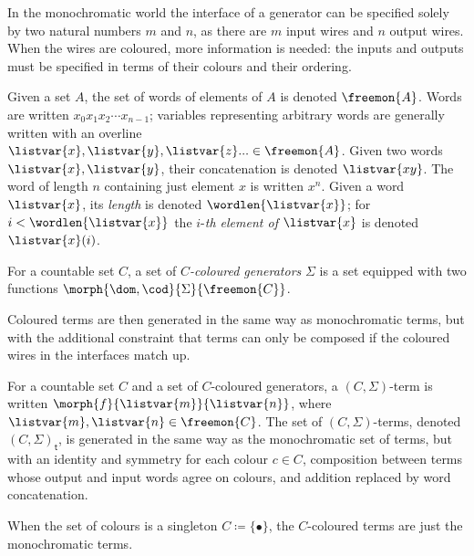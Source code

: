 In the monochromatic world the interface of a generator can be specified solely
by two natural numbers \(m\) and \(n\), as there are \(m\) input wires and
\(n\) output wires.
When the wires are coloured, more information is needed: the inputs and outputs
must be specified in terms of their colours and their ordering.

\begin{notation}[Words]
    Given a set \(A\), the set of words of elements of \(A\) is denoted
    \(\freemon{A}\).
    Words are written \(x_0x_1x_2{\cdots}x_{n-1}\); variables representing
    arbitrary words are generally written with an
    overline \(
    \listvar{x}, \listvar{y}, \listvar{z}... \in \freemon{A}
    \).
    Given two words \(\listvar{x}, \listvar{y}\), their concatenation is
    denoted \(\listvar{xy}\).
    The word of length \(n\) containing just element \(x\) is written \(x^n\).
    Given a word \(\listvar{x}\), its \emph{length} is denoted
    \(\wordlen{\listvar{x}}\); for \(i < \wordlen{\listvar{x}}\) the
    \(i\)-\emph{th element of \(\listvar{x}\)} is denoted \(\listvar{x}(i)\).
\end{notation}

\begin{definition}
    For a countable set \(C\), a set of \emph{\(C\)-coloured generators}
    \(\Sigma\) is a set equipped with two functions
    \(\morph{\dom,\cod}{\Sigma}{\freemon{C}}\).
\end{definition}

Coloured terms are then generated in the same way as monochromatic terms, but
with the additional constraint that terms can only be composed if the coloured
wires in the interfaces match up.

\begin{definition}
    For a countable set \(C\) and a set of \(C\)-coloured generators, a
    \((C,\Sigma)\)-term is written \(\morph{f}{\listvar{m}}{\listvar{n}}\),
    where \(\listvar{m},\listvar{n} \in \freemon{C}\).
    The set of \((C,\Sigma)\)-terms, denoted \((C,\Sigma)_\mathsf{t}\), is
    generated in the same way as the monochromatic set of terms, but with an
    identity and symmetry for each colour \(c \in C\), composition between
    terms whose output and input words agree on colours, and addition replaced
    by word concatenation.
\end{definition}

\begin{remark}
    When the set of colours is a singleton \(C \coloneqq \{\bullet\}\), the
    \(C\)-coloured terms are just the monochromatic terms.
\end{remark}

